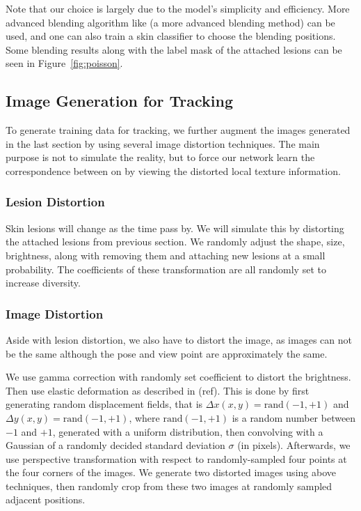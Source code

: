\documentclass[letterpaper]{article}
\begin{document}
Note that our choice is largely due to the model's simplicity and efficiency. More advanced blending algorithm like (a more advanced blending method) can be used, and one can also train a skin classifier to choose the blending positions. Some blending results along with the label mask of the attached lesions can be seen in Figure~\ref{fig:poisson}.

\subsection{Image Generation for Tracking}

To generate training data for tracking, we further augment the images generated in the last section by using several image distortion techniques. The main purpose is not to simulate the reality, but to force our network learn the correspondence between on by viewing the distorted local texture information.

\subsubsection{Lesion Distortion}

Skin lesions will change as the time pass by. We will simulate this by distorting the attached lesions from previous section. We randomly adjust the shape, size, brightness, along with removing them and attaching new lesions at a small probability. The coefficients of these transformation are all randomly set to increase diversity.

\subsubsection{Image Distortion}

Aside with lesion distortion, we also have to distort the image, as images can not be the same although the pose and view point are approximately the same. 

We use gamma correction with randomly set coefficient to distort the brightness. Then use elastic deformation as described in (ref). This is done by first generating random displacement fields, that is $\Delta x(x, y) = \text{rand}(-1, +1)$ and $\Delta y(x, y) = \text{rand}(-1, +1)$, where $\text{rand}(-1, +1)$ is a random number between $-1$ and $+1$, generated with a uniform distribution, then convolving with a Gaussian of a randomly decided standard deviation $\sigma$ (in pixels). Afterwards, we use perspective transformation with respect to randomly-sampled four points at the four corners of the images. We generate two distorted images using above techniques, then randomly crop from these two images at randomly sampled adjacent positions.
\end{document}
